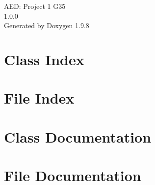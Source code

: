 \documentclass[twoside]{book}
\newcommand{\+}{\discretionary{\mbox{\scriptsize$\hookleftarrow$}}{}{}}
\newcommand{\clearemptydoublepage}{%
    \newpage{\pagestyle{empty}\cleardoublepage}%
  }
\begin{document}
  \raggedbottom
    \hypersetup{pageanchor=false,
                bookmarksnumbered=true,
                pdfencoding=unicode
               }
  \begin{titlepage}
  \vspace*{7cm}
  \begin{center}%
  {\Large AED\+: Project 1 G35}\\
  [1ex]\large 1.\+0.\+0 \\
  \vspace*{1cm}
  {\large Generated by Doxygen 1.9.8}\\
  \end{center}
  \end{titlepage}
  \clearemptydoublepage
  \tableofcontents
  \clearemptydoublepage
  \hypersetup{pageanchor=true}
\chapter{Class Index}

\chapter{File Index}

\chapter{Class Documentation}






\chapter{File Documentation}






  \backmatter
  \newpage
  \clearemptydoublepage
  \printindex
\end{document}
